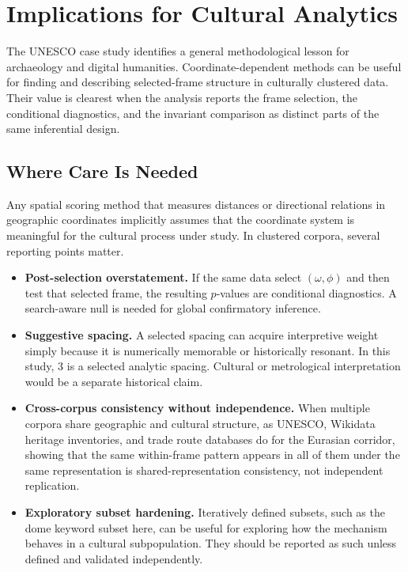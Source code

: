 \documentclass[12pt,a4paper]{article}
\begin{document}
\section{Implications for Cultural Analytics}
\label{sec:implications}

The UNESCO case study identifies a general methodological lesson for
archaeology and digital humanities. Coordinate-dependent methods can be useful
for finding and describing selected-frame structure in culturally clustered
data. Their value is clearest when the analysis reports the frame selection,
the conditional diagnostics, and the invariant comparison as distinct parts of
the same inferential design.

\subsection{Where Care Is Needed}

Any spatial scoring method that measures distances or directional relations in
geographic coordinates implicitly assumes that the coordinate system is
meaningful for the cultural process under study. In clustered corpora, several
reporting points matter.

\begin{itemize}

\item \textbf{Post-selection overstatement.} If the same data select
$(\omega,\phi)$ and then test that selected frame, the resulting $p$-values
are conditional diagnostics. A search-aware null is needed for global
confirmatory inference.

\item \textbf{Suggestive spacing.} A selected spacing can acquire interpretive
weight simply because it is numerically memorable or historically resonant.
In this study, 3\textdegree{} is a selected analytic spacing. Cultural or
metrological interpretation would be a separate historical claim.

\item \textbf{Cross-corpus consistency without independence.} When multiple
corpora share geographic and cultural structure, as UNESCO, Wikidata heritage
inventories, and trade route databases do for the Eurasian corridor, showing
that the same within-frame pattern appears in all of them under the same
representation is shared-representation consistency, not independent
replication.

\item \textbf{Exploratory subset hardening.} Iteratively defined subsets, such
as the dome keyword subset here, can be useful for exploring how the mechanism
behaves in a cultural subpopulation. They should be reported as such unless
defined and validated independently.

\end{itemize}
\end{document}
